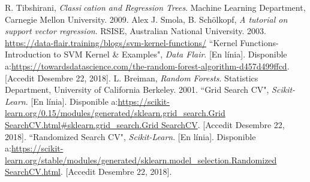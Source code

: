 \documentclass[10pt,a4paper,twocolumn,twoside]{article}
\begin{document}
\begin{thebibliography}{11}
R. Tibshirani, \textit{Classication and Regression Trees}. Machine Learning Department, Carnegie Mellon University. 2009.
Alex J. Smola, B. Schölkopf, \textit{A tutorial on support vector regression}. RSISE, Australian National University. 2003.
\url{https://data-flair.training/blogs/svm-kernel-functions/}
``Kernel Functions-Introduction to SVM Kernel \& Examples", \textit{Data Flair}. [En línia]. Disponible a:\url{https://towardsdatascience.com/the-random-forest-algorithm-d457d499ffcd}. [Accedit Desembre 22, 2018].
L. Breiman, \textit{Random Forests}. Statistics Department, University of California Berkeley. 2001.
``Grid Search CV", \textit{Scikit-Learn}. [En línia]. Disponible a:\url{https://scikit-learn.org/0.15/modules/generated/sklearn.grid_search.Grid SearchCV.html#sklearn.grid_search.Grid SearchCV}. [Accedit Desembre 22, 2018].
``Randomized Search CV", \textit{Scikit-Learn}. [En línia]. Disponible a:\url{https://scikit-learn.org/stable/modules/generated/sklearn.model_selection.Randomized SearchCV.html}. [Accedit Desembre 22, 2018].

\end{thebibliography}
\clearpage
\end{document}
